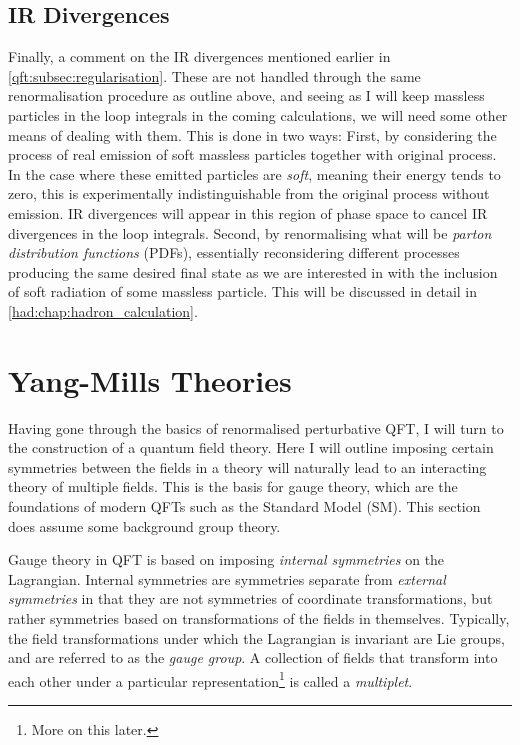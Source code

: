 \documentclass[../main.tex]{subfiles}
\begin{document}
\subsection{IR Divergences}
Finally, a comment on the IR divergences mentioned earlier in \cref{qft:subsec:regularisation}.
These are not handled through the same renormalisation procedure as outline above, and seeing as I will keep massless particles in the loop integrals in the coming calculations, we will need some other means of dealing with them.
This is done in two ways:
First, by considering the process of real emission of soft massless particles together with original process.
In the case where these emitted particles are \emph{soft}, meaning their energy tends to zero, this is experimentally indistinguishable from the original process without emission.
IR divergences will appear in this region of phase space to cancel IR divergences in the loop integrals.
Second, by renormalising what will be \emph{parton distribution functions} (PDFs), essentially reconsidering different processes producing the same desired final state as we are interested in with the inclusion of soft radiation of some massless particle.
This will be discussed in detail in \cref{had:chap:hadron_calculation}.

\section{Yang-Mills Theories}
\label{qft:sec:yang-mills}
Having gone through the basics of renormalised perturbative QFT, I will turn to the construction of a quantum field theory.
Here I will outline imposing certain symmetries between the fields in a theory will naturally lead to an interacting theory of multiple fields.
This is the basis for gauge theory, which are the foundations of modern QFTs such as the Standard Model (SM).
This section does assume some background group theory.
\medskip

Gauge theory in QFT is based on imposing \emph{internal symmetries} on the Lagrangian.
Internal symmetries are symmetries separate from \emph{external symmetries} in that they are not symmetries of coordinate transformations, but rather symmetries based on transformations of the fields in themselves.
Typically, the field transformations under which the Lagrangian is invariant are Lie groups, and are referred to as the \emph{gauge group}.
A collection of fields that transform into each other under a particular representation\footnote{More on this later.} is called a \emph{multiplet}.
\end{document}
